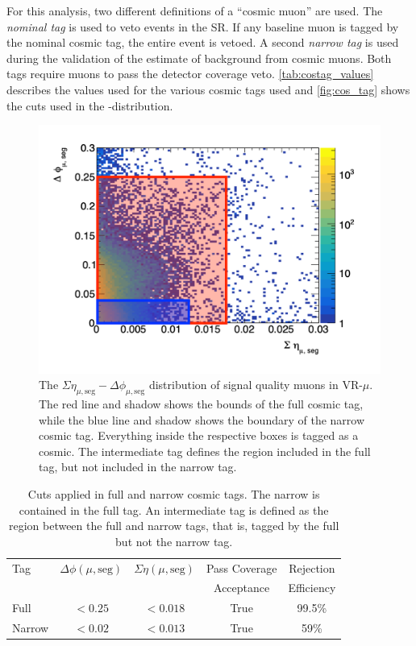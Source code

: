 For this analysis, two different definitions of a ``cosmic muon'' are used. The \emph{nominal tag} is used to veto events in the \ac{SR}. If any baseline muon is tagged by the nominal cosmic tag, the entire event is vetoed. A second \emph{narrow tag} is used during the validation of the estimate of background from cosmic muons. Both tags require muons to pass the detector coverage veto. \autoref{tab:costag_values} describes the values used for the various cosmic tags used and \autoref{fig:cos_tag} shows the cuts used in the \dphicos-\sigeta distribution. 

\begin{figure}[!ht]
\centering
\includegraphics[width=.48\textwidth]{figures/cosmics/cosmic_tag.png}
\caption{The $\Sigma\eta_{\mu,\textrm{seg}} - \Delta\phi_{\mu,\textrm{seg}}$ distribution of signal quality muons in VR-$\mu$. The red line and shadow shows the bounds of the full cosmic tag, while the blue line and shadow shows the boundary of the narrow cosmic tag. Everything inside the respective boxes is tagged as a cosmic. The intermediate tag defines the region included in the full tag, but not included in the narrow tag.}
\label{fig:cos_tag}
\end{figure}

\begin{table}
\centering
\begin{tabular}{lcccc}
Tag & $\Delta \phi (\mu, \textrm{seg})$ & $\Sigma \eta (\mu, \textrm{seg})$ & Pass Coverage  & Rejection \\
 &                                         &                                &    Acceptance & Efficiency \\
\hline
Full   & $<0.25$   & $ <0.018 $   & True & 99.5\% \\
Narrow & $<0.02$   & $ <0.013$    & True & 59\% \\
\hline
\end{tabular}
\caption{Cuts applied in full and narrow cosmic tags. The narrow is contained in the full tag. An intermediate tag is defined as the region between the full and narrow tags, that is, tagged by the full but not the narrow tag.}
\label{tab:costag_values}
\end{table}

